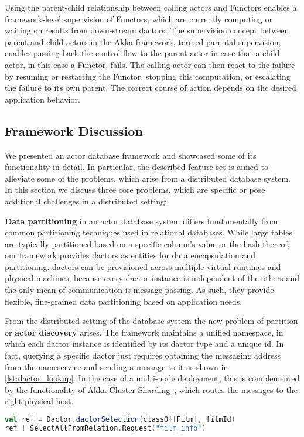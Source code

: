 Using the parent-child relationship between calling actors and Functors enables a framework-level supervision of Functors, which are currently computing or waiting on results from down-stream \glspl{dactor}.
The supervision concept between parent and child actors in the Akka framework, termed parental supervision, enables passing back the control flow to the parent actor in case that a child actor, in this case a Functor, fails.
The calling actor can then react to the failure by resuming or restarting the Functor, stopping this computation, or escalating the failure to its own parent.
The correct course of action depends on the desired application behavior.

\subsection[Framework Discussion]{Framework Discussion}\label{subsec:framework_discussion}

We presented an actor database framework and showcased some of its functionality in detail.
In particular, the described feature set is aimed to alleviate some of the problems, which arise from a distributed database system.
In this section we discuss three core problems, which are specific or pose additional challenges in a distributed setting:

\textbf{Data partitioning} in an actor database system differs fundamentally from common partitioning techniques used in relational databases.
While large tables are typically partitioned based on a specific column's value or the hash thereof, our framework provides \glspl{dactor} as entities for data encapsulation and partitioning.
\Glspl{dactor} can be provisioned across multiple virtual runtimes and physical machines, because every \gls{dactor} instance is independent of the others and the only mean of communication is message passing.
As such, they provide flexible, fine-grained data partitioning based on application needs.

From the distributed setting of the database system the new problem of partition or \textbf{actor discovery} arises.
The framework maintains a unified namespace, in which each \gls{dactor} instance is identified by its \gls{dactor} type and a unique id.
In fact, querying a specific \gls{dactor} just requires obtaining the messaging address from the nameservice and sending a message to it as shown in \cref{lst:dactor_lookup}.
In the case of a multi-node deployment, this is complemented by the functionality of Akka Cluster Sharding~\cite{akka:clustersharding}, which routes the messages to the right physical host.
\begin{lstlisting}[float,caption={Lookup of and querying from a Film dactor instance.}, label={lst:dactor_lookup}, language=Scala]
val ref = Dactor.dactorSelection(classOf[Film], filmId)
ref ! SelectAllFromRelation.Request("film_info")
\end{lstlisting}


